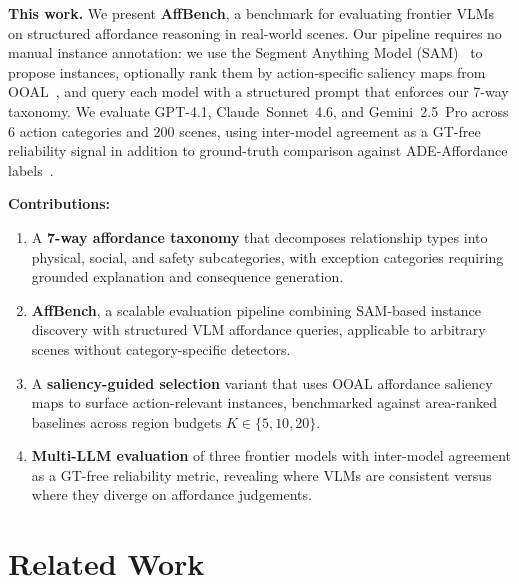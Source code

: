 \documentclass[runningheads]{llncs}
\newcommand{\numimages}{200}      %
\newcommand{\numactions}{6}
\begin{document}
\noindent\textbf{This work.} We present \textbf{AffBench}, a benchmark
for evaluating frontier VLMs on structured affordance reasoning in
real-world scenes. Our pipeline requires no manual instance annotation: we
use the Segment Anything Model (SAM)~\cite{kirillov2023sam} to propose
instances, optionally rank them by action-specific saliency maps from
OOAL~\cite{ooal}, and query each model with a structured prompt that
enforces our 7-way taxonomy. We evaluate GPT-4.1, Claude~Sonnet~4.6, and
Gemini~2.5~Pro across \numactions{} action categories and \numimages{}
scenes, using inter-model agreement as a GT-free reliability signal in
addition to ground-truth comparison against ADE-Affordance
labels~\cite{ade_affordance}.

\noindent\textbf{Contributions:}
\begin{enumerate}
  \item A \textbf{7-way affordance taxonomy} that decomposes relationship
    types into physical, social, and safety subcategories, with exception
    categories requiring grounded explanation and consequence generation.

  \item \textbf{AffBench}, a scalable evaluation pipeline combining
    SAM-based instance discovery with structured VLM affordance queries,
    applicable to arbitrary scenes without category-specific detectors.

  \item A \textbf{saliency-guided selection} variant that uses OOAL
    affordance saliency maps to surface action-relevant instances,
    benchmarked against area-ranked baselines across region budgets
    $K \in \{5, 10, 20\}$.

  \item \textbf{Multi-LLM evaluation} of three frontier models with
    inter-model agreement as a GT-free reliability metric, revealing where
    VLMs are consistent versus where they diverge on affordance judgements.
\end{enumerate}


\section{Related Work}
\label{sec:related}
\end{document}
